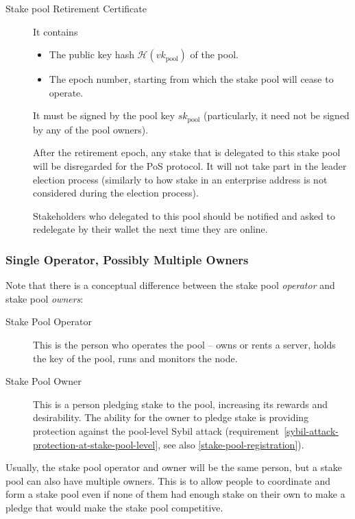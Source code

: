\documentclass[11pt,a4paper,dvipsnames,twosided]{article}
\begin{document}
\begin{description}
\item[Stake pool Retirement Certificate]
It contains

\begin{itemize}
\item
  The public key hash \(\mathcal{H}(vk_\text{pool})\) of the pool.
\item
  The epoch number, starting from which the stake pool will cease to
  operate.
\end{itemize}

It must be signed by the pool key \(sk_\text{pool}\) (particularly, it need not
be signed by any of the pool owners).

After the retirement epoch, any stake that is delegated to this stake
pool will be disregarded for the PoS protocol. It will not take part in
the leader election process (similarly to how stake in an enterprise
address is not considered during the election process).

Stakeholders who delegated to this pool should be notified and asked to
redelegate by their wallet the next time they are online.
\end{description}

\subsubsection{Single Operator, Possibly Multiple Owners}
\label{multiple-owners}

Note that there is a conceptual difference between the stake pool
\emph{operator} and stake pool \emph{owners}:
\begin{description}
\item[Stake Pool Operator] This is the person who operates the pool -- owns or
  rents a server, holds the key of the pool, runs and monitors the
  node.
\item[Stake Pool Owner] This is a person pledging stake
  to the pool, increasing its rewards and desirability. The ability
  for the owner to pledge stake is providing protection against the
  pool-level Sybil attack
  (requirement~\ref{sybil-attack-protection-at-stake-pool-level}, see
  also \cref{stake-pool-registration}).
\end{description}

Usually, the stake pool operator and owner will be the same person,
but a stake pool can also have multiple owners. This is to allow
people to coordinate and form a stake pool even if none of them had
enough stake on their own to make a pledge that would make the stake
pool competitive.
\end{document}
